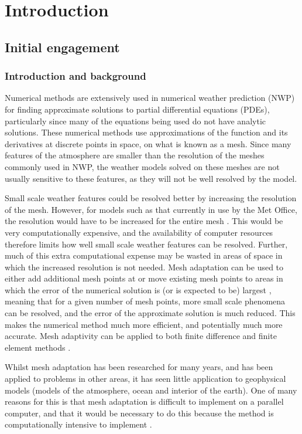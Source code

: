 \chapter{Introduction}
\section{Initial engagement}
\subsection{Introduction and background}
Numerical methods are extensively used in numerical weather prediction (NWP) for finding approximate solutions to partial differential equations (PDEs), particularly since many of the equations being used do not have analytic solutions. These numerical methods use approximations of the function and its derivatives at discrete points in space, on what is known as a mesh. Since many features of the atmosphere are smaller than the resolution of the meshes commonly used in NWP, the weather models solved on these meshes are not usually sensitive to these features, as they will not be well resolved by the model. 

Small scale weather features could be resolved better by increasing the resolution of the mesh. However, for models such as that currently in use by the Met Office, the resolution would have to be increased for the entire mesh \parencite{endgame}.  This would be very computationally expensive, and the availability of computer resources therefore limits how well small scale weather features can be resolved. Further, much of this extra computational expense may be wasted in areas of space in which the increased resolution is not needed. Mesh adaptation can be used to either add additional mesh points at or move existing mesh points to areas in which the error of the numerical solution is (or is expected to be) largest \parencite{HRR93}, meaning that for a given number of mesh points, more small scale phenomena can be resolved, and the error of the approximate solution is much reduced. This makes the numerical method much more efficient, and potentially much more accurate. Mesh adaptivity can be applied to both finite difference and finite element methods \autocite{HRR93}.

Whilst mesh adaptation has been researched for many years, and has been applied to problems in other areas, it has seen little application to geophysical models (models of the atmosphere, ocean and interior of the earth). One of many reasons for this is that mesh adaptation is difficult to implement on a parallel computer, and that it would be necessary to do this because the method is computationally intensive to implement \parencite{weller10}. 

